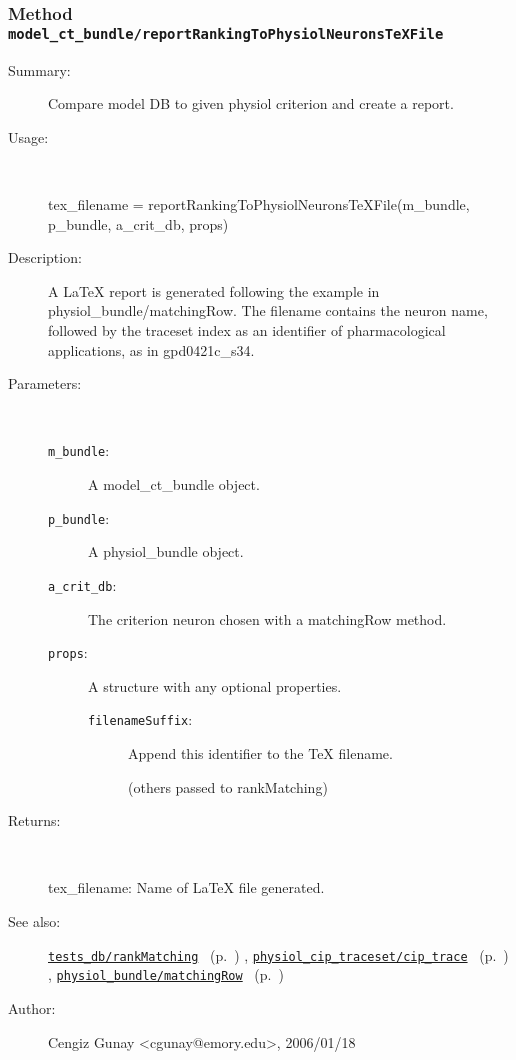 \subsubsection[Method \texttt{reportRankingToPhysiolNeuronsTeXFile}]{Method \texttt{model\_ct\_bundle/reportRankingToPhysiolNeuronsTeXFile}}%
%
\label{ref_model_ct_bundle__reportRankingToPhysiolNeuronsTeXFile}%
\hypertarget{ref_model_ct_bundle__reportRankingToPhysiolNeuronsTeXFile}{}%
\begin{description}
\item[Summary:]Compare model DB to given physiol criterion and create a report.
%
\item[Usage:]~%
\begin{lyxcode}%
tex\_filename = reportRankingToPhysiolNeuronsTeXFile(m\_bundle, p\_bundle, a\_crit\_db, props)
%
\end{lyxcode}%
%
\item[Description:]%
A LaTeX report is generated 
 following the example in physiol\_bundle/matchingRow. The filename contains the neuron
 name, followed by the traceset index as an identifier of pharmacological applications,
 as in gpd0421c\_s34. 
\item[Parameters:]~
\begin{description}%
\item[\texttt{m\_bundle}:]
 A model\_ct\_bundle object.
\item[\texttt{p\_bundle}:]
 A physiol\_bundle object.
\item[\texttt{a\_crit\_db}:]
 The criterion neuron chosen with a matchingRow method.
\item[\texttt{props}:]
 A structure with any optional properties.
\begin{description}%
\item[\texttt{filenameSuffix}:]
 Append this identifier to the TeX filename.

(others passed to rankMatching)\end{description}%
\end{description}%
%
\item[Returns: ]~

	tex\_filename: Name of LaTeX file generated.
%
%
\item[See also:]%
\hyperlink{ref_tests_db__rankMatching}{\texttt{tests\_db/rankMatching}}%
\ (p.~\pageref{ref_tests_db__rankMatching})%
%
, \hyperlink{ref_physiol_cip_traceset__cip_trace}{\texttt{physiol\_cip\_traceset/cip\_trace}}%
\ (p.~\pageref{ref_physiol_cip_traceset__cip_trace})%
%
, \hyperlink{ref_physiol_bundle__matchingRow}{\texttt{physiol\_bundle/matchingRow}}%
\ (p.~\pageref{ref_physiol_bundle__matchingRow})%
%
%
\item[Author:]%
Cengiz Gunay <cgunay@emory.edu>, 2006/01/18%
\end{description}
\methodline%
